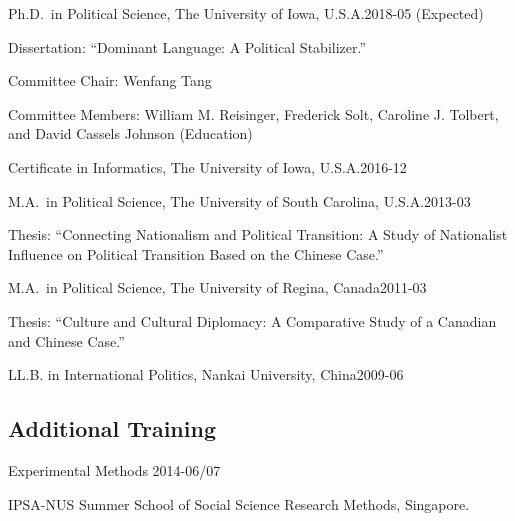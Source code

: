 \documentclass[10.5pt,]{article}
\providecommand{\tightlist}{%
  \setlength{\itemsep}{0pt}\setlength{\parskip}{0pt}}
\renewenvironment{itemize}{
  \begin{list}{}{
    \setlength{\leftmargin}{1.5em}
  }
}{
  \end{list}
}
\begin{document}
\begin{itemize}
\tightlist
\item
  Ph.D.~in Political Science, The University of Iowa,
  U.S.A.\hfill 2018-05 (Expected)

  \begin{itemize}
  \tightlist
  \item
    \footnotesize Dissertation: ``Dominant Language: A Political
    Stabilizer.''

    \begin{itemize}
    \tightlist
    \item
      Committee Chair: Wenfang Tang
    \item
      Committee Members: William M. Reisinger, Frederick Solt, Caroline
      J. Tolbert, and David Cassels Johnson (Education)
    \end{itemize}
  \end{itemize}
\item
  Certificate in Informatics, The University of Iowa,
  U.S.A.\hfill 2016-12
\item
  M.A.~in Political Science, The University of South Carolina,
  U.S.A.\hfill 2013-03

  \begin{itemize}
  \tightlist
  \item
    \footnotesize Thesis: ``Connecting Nationalism and Political
    Transition: A Study of Nationalist Influence on Political Transition
    Based on the Chinese Case.''
  \end{itemize}
\item
  M.A.~in Political Science, The University of Regina,
  Canada\hfill 2011-03

  \begin{itemize}
  \tightlist
  \item
    \footnotesize Thesis: ``Culture and Cultural Diplomacy: A
    Comparative Study of a Canadian and Chinese Case.''
  \end{itemize}
\item
  LL.B. in International Politics, Nankai University,
  China\hfill 2009-06
\end{itemize}

\subsection{Additional Training}\label{additional-training}

\begin{itemize}
\tightlist
\item
  Experimental Methods \hfill 2014-06/07

  \begin{itemize}
  \tightlist
  \item
    \footnotesize IPSA-NUS Summer School of Social Science Research
    Methods, Singapore.
  \end{itemize}
\end{itemize}
\end{document}
